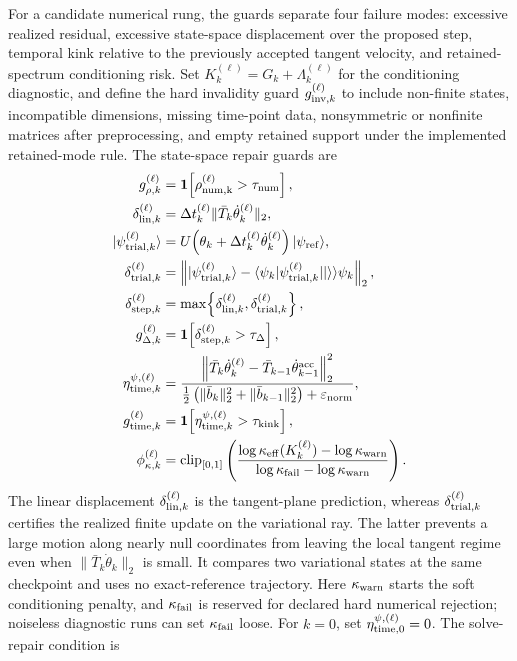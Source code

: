 \documentclass[
  reprint,
  amsmath,
  amssymb,
  aps,
  pra,
  nofootinbib,
  superscriptaddress,
  floatfix
]{revtex4-2}
\newcommand{\eps}{\varepsilon}
\newcommand{\ket}[1]{|#1\rangle}
\newcommand{\braket}[2]{\langle #1|#2\rangle}
\begin{document}
For a candidate numerical rung, the guards separate four failure modes: excessive realized residual, excessive state-space displacement over the proposed step, temporal kink relative to the previously accepted tangent velocity, and retained-spectrum conditioning risk.  Set $K_k^{(\ell)}=G_k+\Lambda_k^{(\ell)}$ for the conditioning diagnostic, and define the hard invalidity guard $g_{{\rm inv},k}^{(\ell)}$ to include non-finite states, incompatible dimensions, missing time-point data, nonsymmetric or nonfinite matrices after preprocessing, and empty retained support under the implemented retained-mode rule.  The state-space repair guards are
\begin{equation}
\begin{aligned}
g_{\rho,k}^{(\ell)}
&=
\mathbf 1\!\left[
\rho_{\rm num,k}^{(\ell)}>\tau_{\rm num}
\right],
\\
\delta_{{\rm lin},k}^{(\ell)}
&=
\Delta t_k^{(\ell)}\|\bar T_k\dot\theta_k^{(\ell)}\|_2,
\\
\ket{\psi_{{\rm trial},k}^{(\ell)}}
&=
U\!\left(\theta_k+\Delta t_k^{(\ell)}\dot\theta_k^{(\ell)}\right)
\ket{\psi_{\rm ref}},
\\
\delta_{{\rm trial},k}^{(\ell)}
&=
\left\|
\ket{\psi_{{\rm trial},k}^{(\ell)}}
-
\braket{\psi_k|\psi_{{\rm trial},k}^{(\ell)}}\ket{\psi_k}
\right\|_2,
\\
\delta_{{\rm step},k}^{(\ell)}
&=
\max\!\left\{
\delta_{{\rm lin},k}^{(\ell)},
\delta_{{\rm trial},k}^{(\ell)}
\right\},
\\
g_{\Delta,k}^{(\ell)}
&=
\mathbf 1\!\left[
\delta_{{\rm step},k}^{(\ell)}>\tau_{\Delta}
\right],
\\
\eta_{{\rm time},k}^{\psi,(\ell)}
&=
\frac{
\left\|
\bar T_k\dot\theta_k^{(\ell)}
-
\bar T_{k-1}\dot\theta_{k-1}^{\rm acc}
\right\|_2^2
}{
\frac12\left(
\|\bar b_k\|_2^2+\|\bar b_{k-1}\|_2^2
\right)+\eps_{\rm norm}
},
\\
g_{{\rm time},k}^{(\ell)}
&=
\mathbf 1\!\left[
\eta_{{\rm time},k}^{\psi,(\ell)}>\tau_{\rm kink}
\right],
\\
\phi_{\kappa,k}^{(\ell)}
&=
\operatorname{clip}_{[0,1]}
\left(
\frac{
\log\kappa_{\rm eff}(K_k^{(\ell)})-\log\kappa_{\rm warn}
}{
\log\kappa_{\rm fail}-\log\kappa_{\rm warn}
}
\right).
\end{aligned}
\label{eq:solve_repair_guards}
\end{equation}
The linear displacement $\delta_{{\rm lin},k}^{(\ell)}$ is the tangent-plane prediction, whereas $\delta_{{\rm trial},k}^{(\ell)}$ certifies the realized finite update on the variational ray.  The latter prevents a large motion along nearly null coordinates from leaving the local tangent regime even when $\|\bar T_k\dot\theta_k\|_2$ is small.  It compares two variational states at the same checkpoint and uses no exact-reference trajectory.  Here $\kappa_{\rm warn}$ starts the soft conditioning penalty, and $\kappa_{\rm fail}$ is reserved for declared hard numerical rejection; noiseless diagnostic runs can set $\kappa_{\rm fail}$ loose.  For $k=0$, set $\eta_{{\rm time},0}^{\psi,(\ell)}=0$.  The solve-repair condition is
\end{document}
